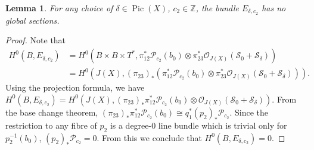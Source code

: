 \documentclass{article}[12pt]
\newtheorem{lemma}[theorem]{Lemma}
\theoremstyle{definition}
\theoremstyle{remark}
\newcommand \Z{\mathbb Z}
\numberwithin{equation}{section}
\newcommand \mc{\mathcal}
\DeclareMathOperator{\Pic}{Pic}
\begin{document}
\begin{lemma}\label{no-sections}
    For any choice of $\delta \in \Pic(X)$, $c_2\in \Z$, the bundle $E_{\delta,c_2}$ has no global sections.
\end{lemma}
\begin{proof}
    Note that \begin{align*}H^0(B,E_{\delta,c_2})&=H^0(B\times B \times T^*, \pi_{12}^*\mc{P}_{c_2}(b_0)\otimes \pi_{23}^* \mc{O}_{J(X)}(\mc{S}_0+\mc{S}_\delta))\\
    &=H^0(J(X), (\pi_{23})_*(\pi_{12}^*\mc{P}_{c_2}(b_0)\otimes \pi_{23}^*\mc{O}_{J(X)}(\mc{S}_0+\mc{S}_\delta))).\end{align*} Using the projection formula, we have $H^0(B, E_{\delta,c_2})=H^0(J(X), (\pi_{23})_*\pi_{12}^*\mc{P}_{c_2}(b_0)\otimes \mc{O}_{J(X)}(\mc{S}_0+\mc{S}_\delta)).$ From the base change theorem, $(\pi_{23})_*\pi_{12}^*\mc{P}_{c_2}(b_0)\cong q_1^*(p_2)_*\mc{P}_{c_2}.$ Since the restriction to any fibre of $p_2$ is a degree-0 line bundle which is trivial only for $p_2^{-1}(b_0)$, $(p_2)_*\mc{P}_{c_2}=0$. From this we conclude that $H^0(B, E_{\delta,c_2})=0$.
\end{proof}
\end{document}
